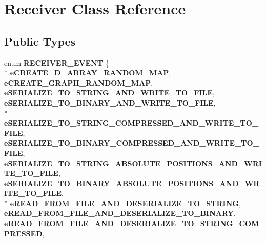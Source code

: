 \hypertarget{class_receiver}{}\section{Receiver Class Reference}
\label{class_receiver}
\subsection*{Public Types}
\begin{DoxyCompactItemize}
\item 
\hypertarget{class_receiver_a7c9717be84a4956c0d42d497e5cecd85}{}enum {\bfseries R\+E\+C\+E\+I\+V\+E\+R\+\_\+\+E\+V\+E\+N\+T} \{ \\*
{\bfseries e\+C\+R\+E\+A\+T\+E\+\_\+D\+\_\+\+A\+R\+R\+A\+Y\+\_\+\+R\+A\+N\+D\+O\+M\+\_\+\+M\+A\+P}, 
{\bfseries e\+C\+R\+E\+A\+T\+E\+\_\+\+G\+R\+A\+P\+H\+\_\+\+R\+A\+N\+D\+O\+M\+\_\+\+M\+A\+P}, 
{\bfseries e\+S\+E\+R\+I\+A\+L\+I\+Z\+E\+\_\+\+T\+O\+\_\+\+S\+T\+R\+I\+N\+G\+\_\+\+A\+N\+D\+\_\+\+W\+R\+I\+T\+E\+\_\+\+T\+O\+\_\+\+F\+I\+L\+E}, 
{\bfseries e\+S\+E\+R\+I\+A\+L\+I\+Z\+E\+\_\+\+T\+O\+\_\+\+B\+I\+N\+A\+R\+Y\+\_\+\+A\+N\+D\+\_\+\+W\+R\+I\+T\+E\+\_\+\+T\+O\+\_\+\+F\+I\+L\+E}, 
\\*
{\bfseries e\+S\+E\+R\+I\+A\+L\+I\+Z\+E\+\_\+\+T\+O\+\_\+\+S\+T\+R\+I\+N\+G\+\_\+\+C\+O\+M\+P\+R\+E\+S\+S\+E\+D\+\_\+\+A\+N\+D\+\_\+\+W\+R\+I\+T\+E\+\_\+\+T\+O\+\_\+\+F\+I\+L\+E}, 
{\bfseries e\+S\+E\+R\+I\+A\+L\+I\+Z\+E\+\_\+\+T\+O\+\_\+\+B\+I\+N\+A\+R\+Y\+\_\+\+C\+O\+M\+P\+R\+E\+S\+S\+E\+D\+\_\+\+A\+N\+D\+\_\+\+W\+R\+I\+T\+E\+\_\+\+T\+O\+\_\+\+F\+I\+L\+E}, 
{\bfseries e\+S\+E\+R\+I\+A\+L\+I\+Z\+E\+\_\+\+T\+O\+\_\+\+S\+T\+R\+I\+N\+G\+\_\+\+A\+B\+S\+O\+L\+U\+T\+E\+\_\+\+P\+O\+S\+I\+T\+I\+O\+N\+S\+\_\+\+A\+N\+D\+\_\+\+W\+R\+I\+T\+E\+\_\+\+T\+O\+\_\+\+F\+I\+L\+E}, 
{\bfseries e\+S\+E\+R\+I\+A\+L\+I\+Z\+E\+\_\+\+T\+O\+\_\+\+B\+I\+N\+A\+R\+Y\+\_\+\+A\+B\+S\+O\+L\+U\+T\+E\+\_\+\+P\+O\+S\+I\+T\+I\+O\+N\+S\+\_\+\+A\+N\+D\+\_\+\+W\+R\+I\+T\+E\+\_\+\+T\+O\+\_\+\+F\+I\+L\+E}, 
\\*
{\bfseries e\+R\+E\+A\+D\+\_\+\+F\+R\+O\+M\+\_\+\+F\+I\+L\+E\+\_\+\+A\+N\+D\+\_\+\+D\+E\+S\+E\+R\+I\+A\+L\+I\+Z\+E\+\_\+\+T\+O\+\_\+\+S\+T\+R\+I\+N\+G}, 
{\bfseries e\+R\+E\+A\+D\+\_\+\+F\+R\+O\+M\+\_\+\+F\+I\+L\+E\+\_\+\+A\+N\+D\+\_\+\+D\+E\+S\+E\+R\+I\+A\+L\+I\+Z\+E\+\_\+\+T\+O\+\_\+\+B\+I\+N\+A\+R\+Y}, 
{\bfseries e\+R\+E\+A\+D\+\_\+\+F\+R\+O\+M\+\_\+\+F\+I\+L\+E\+\_\+\+A\+N\+D\+\_\+\+D\+E\+S\+E\+R\+I\+A\+L\+I\+Z\+E\+\_\+\+T\+O\+\_\+\+S\+T\+R\+I\+N\+G\+\_\+\+C\+O\+M\+P\+R\+E\+S\+S\+E\+D}, 

\end{DoxyCompactItemize}
